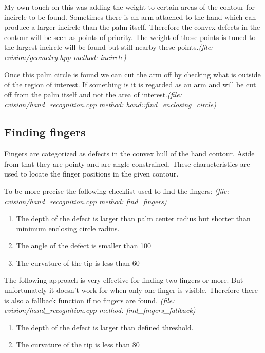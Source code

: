 \documentclass[11pt,a4paper]{article}
\begin{document}
My own touch on this was adding the weight to certain areas of the contour for incircle to be found. Sometimes there is an arm attached to the hand which can produce a larger incircle than the palm itself. Therefore the convex defects in the contour will be seen as points of priority. The weight of those points is tuned to the largest incircle will be found but still nearby these points.\textit{(file: cvision/geometry.hpp method: incircle)}\bigskip

Once this palm circle is found we can cut the arm off by checking what is outside of the region of interest. If something is it is regarded as an arm and will be cut off from the palm itself and not the area of interest.\textit{(file: cvision/hand\_recognition.cpp method: hand::find\_enclosing\_circle)}

\subsection{Finding fingers}
Fingers are categorized as defects in the convex hull of the hand contour. Aside from that they are pointy and are angle constrained. These characteristics are used to locate the finger positions in the given contour.\citet{Yeo2015}\bigskip

To be more precise the following checklist used to find the fingers:
\textit{(file: cvision/hand\_recognition.cpp method: find\_fingers)}
\begin{enumerate}
\item The depth of the defect is larger than palm center radius but shorter than minimum enclosing circle radius.
\item The angle of the defect is smaller than 100\degree
\item The curvature of the tip is less than 60\degree
\end{enumerate}

The following approach is very effective for finding two fingers or more. But unfortunately it doesn't work for when only one finger is visible. Therefore there is also a fallback function if no fingers are found.
\textit{(file: cvision/hand\_recognition.cpp method: find\_fingers\_fallback)}
\begin{enumerate}
\item The depth of the defect is larger than defined threshold.
\item The curvature of the tip is less than 80
\end{enumerate}
\end{document}

